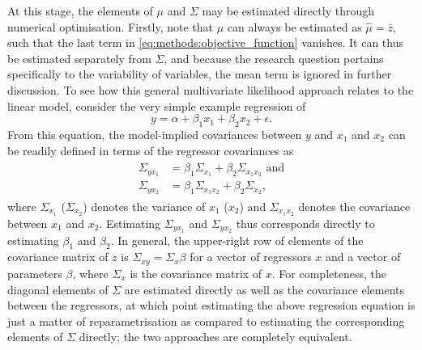 At this stage, the elements of $\mu$ and $\Sigma$ may be estimated directly through numerical optimisation.
Firstly, note that $\mu$ can always be estimated as $\hat{\mu} = \bar{z}$, such that the last term in
\cref{eq:methods:objective_function} vanishes. It can thus be estimated separately from $\Sigma$,
and because the research question pertains specifically to the variability of variables,
the mean term is ignored in further discussion.
To see how this general multivariate likelihood approach relates to the linear model, consider the very simple example
regression of
\begin{equation}
    \label{eq:methods:simple_regression}
    y = \alpha + \beta_1 x_1 + \beta_2 x_2 + \epsilon.
\end{equation}
From this equation, the model-implied covariances between $y$
and $x_1$ and $x_2$ can be readily defined in terms of the regressor covariances as
\begin{align}
\begin{split}
    \label{eq:methods:covariance_simple_regression}
    \Sigma_{y x_1} &= \beta_1 \Sigma_{x_1} + \beta_2 \Sigma_{x_1 x_2}\text{ and} \\
    \Sigma_{y x_2} &= \beta_1 \Sigma_{x_1 x_2} + \beta_2 \Sigma_{x_2},
\end{split}
\end{align}
where $\Sigma_{x_1}$ ($\Sigma_{x_2}$) denotes the variance of $x_1$ ($x_2$) and $\Sigma_{x_1 x_2}$ denotes the covariance between $x_1$ and $x_2$.
Estimating $\Sigma_{y x_1}$ and $\Sigma_{y x_2}$ thus corresponds directly to estimating $\beta_1$ and $\beta_2$.
In general, the upper-right row of elements of the covariance matrix of $z$ is $\Sigma_{xy} = \Sigma_x \beta$ for
a vector of regressors $x$ and a vector of parameters $\beta$, where $\Sigma_x$ is the covariance matrix of $x$.
For completeness, the diagonal elements of $\Sigma$ are estimated directly as well as the covariance elements between
the regressors, at which point estimating the above regression equation is just a matter of reparametrisation as compared
to estimating the corresponding elements of $\Sigma$ directly; the two approaches are completely equivalent.

